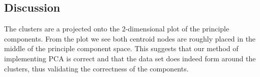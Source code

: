 \subsection{Discussion}
The clusters are a projected onto the 2-dimensional plot of the principle components. From the plot we see both centroid nodes are roughly placed in the middle of the principle component space. This suggests that our method of implementing PCA is correct and that the data set does indeed form around the clusters, thus validating the correctness of the components.
